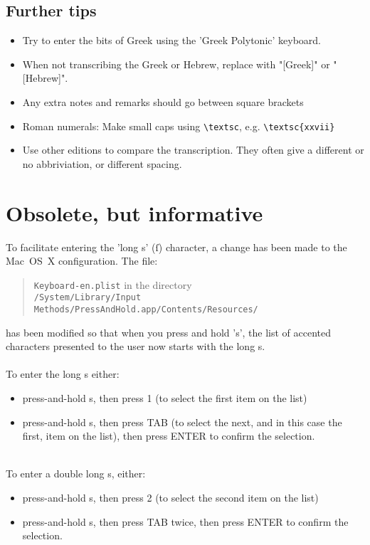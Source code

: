 \documentclass{report}
\begin{document}
\subsection{Further tips}
\begin{itemize}
\item Try to enter the bits of Greek using the 'Greek Polytonic' keyboard.
\item When not transcribing the Greek or Hebrew, replace with "[Greek]" or
 "[Hebrew]".
\item Any extra notes and remarks should go between square brackets
\item Roman numerals: Make small caps using \verb+\textsc+,
 e.g. \verb+\textsc{xxvii}+
\item Use other editions to compare the transcription. They often give a
 different or no abbriviation, or different spacing.
\end{itemize}

\section{Obsolete, but informative}
To facilitate entering the 'long s' (ſ) character, a change has been made to
 the Mac~OS~X configuration. The file:
\begin{quote}
\texttt{Keyboard-en.plist} in the directory\\
\texttt{/System/Library/Input Methods/PressAndHold.app/Contents/Resources/}
\end{quote}
has been modified so that when you press and hold 's', the list of accented
 characters presented to the user now starts with the long s.
\\
\\
To enter the long s either:
\begin{itemize}
\item press-and-hold s, then press 1 (to select the first item on the list)
\item press-and-hold s, then press TAB (to select the next, and in this case
 the first, item on the list), then press ENTER to confirm the selection.
\end{itemize}
~
\\
To enter a double long s, either:
\begin{itemize}
\item press-and-hold s, then press 2 (to select the second item on the list)
\item press-and-hold s, then press TAB twice, then press ENTER to confirm
 the selection.
\end{itemize}
\end{document}
